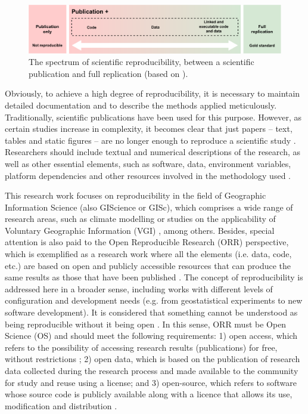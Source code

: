 \documentclass[ijgi,article,submit,moreauthors,pdftex]{Definitions/mdpi}
\begin{document}
\begin{figure}[!ht]
  \centering
  \includegraphics[width=\textwidth]{images/fig1.pdf}
  \caption{The spectrum of scientific reproducibility, between a scientific publication and full replication (based on \cite{Peng2011a}).}
  \label{fig:reproducibility_spectrum}
\end{figure}

Obviously, to achieve a high degree of reproducibility, it is necessary to maintain detailed documentation and to describe the methods applied meticulously. Traditionally, scientific publications have been used for this purpose. However, as certain studies increase in complexity, it becomes clear that just papers -- text, tables and static figures -- are no longer enough to reproduce a scientific study \cite{Stodden2014}. Researchers should include textual and numerical descriptions of the research, as well as other essential elements, such as software, data, environment variables, platform dependencies and other resources involved in the methodology used \cite{Singleton2016b}.

This research work focuses on reproducibility in the field of Geographic Information Science \cite{goodchild1992geographical} (also GIScience or GISc), which comprises a wide range of research areas, such as climate modelling \cite{Peng2011a} or studies on the applicability of Voluntary Geographic Information (VGI) \cite{Ostermann2017a}, among others. Besides, special attention is also paid to the Open Reproducible Research (ORR) perspective, which is exemplified as a research work where all the elements (i.e. data, code, etc.) are based on open and publicly accessible resources that can produce the same results as those that have been published \cite{goodman2016does}. The concept of reproducibility is addressed here in a broader sense, including works with different levels of configuration and development needs (e.g. from geostatistical experiments to new software development). It is considered that something cannot be understood as being reproducible without it being open \cite{pontika2015fostering}. In this sense, ORR must be Open Science (OS) and should meet the following requirements: 1) open access, which refers to the possibility of accessing research results (publications) for free, without restrictions \cite{antelman2006open}; 2) open data, which is based on the publication of research data collected during the research process and made available to the community for study and reuse \cite{murray2008open} using a license; and 3) open-source, which refers to software whose source code is publicly available along with a licence that allows its use, modification and distribution \cite{perens1999open}.
\end{document}
